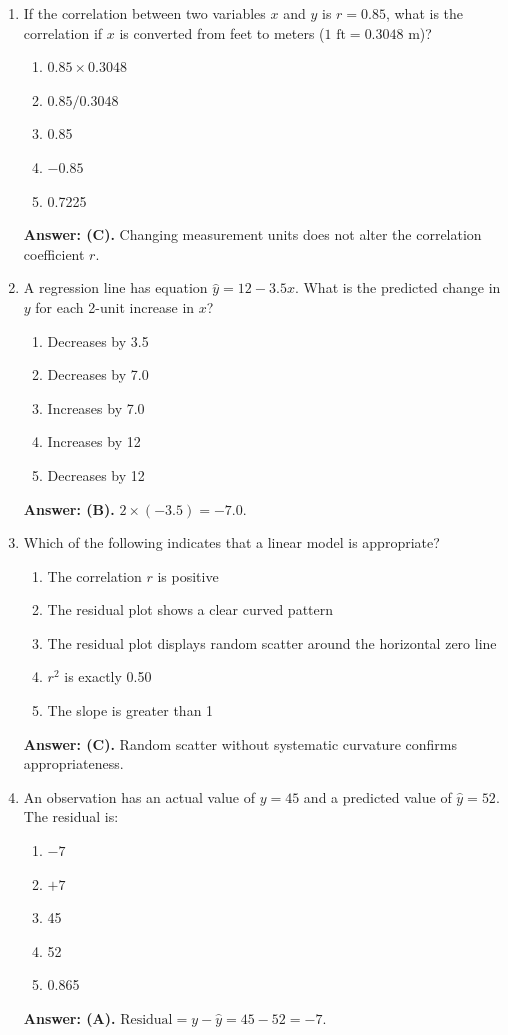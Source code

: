 \begin{enumerate}[leftmargin=1.5em]
  \item If the correlation between two variables $x$ and $y$ is $r = 0.85$, what is the correlation if $x$ is converted from feet to meters ($1\text{ ft} = 0.3048\text{ m}$)?
  \begin{enumerate}[label=(\Alph*)]
    \item $0.85 \times 0.3048$ \item $0.85 / 0.3048$ \item 0.85 \item $-0.85$ \item 0.7225
  \end{enumerate}
  \textbf{Answer: (C).} Changing measurement units does not alter the correlation coefficient $r$.

  \item A regression line has equation $\hat{y} = 12 - 3.5x$. What is the predicted change in $y$ for each 2-unit increase in $x$?
  \begin{enumerate}[label=(\Alph*)]
    \item Decreases by 3.5 \item Decreases by 7.0 \item Increases by 7.0 \item Increases by 12 \item Decreases by 12
  \end{enumerate}
  \textbf{Answer: (B).} $2 \times (-3.5) = -7.0$.

  \item Which of the following indicates that a linear model is appropriate?
  \begin{enumerate}[label=(\Alph*)]
    \item The correlation $r$ is positive \item The residual plot shows a clear curved pattern \item The residual plot displays random scatter around the horizontal zero line \item $r^2$ is exactly 0.50 \item The slope is greater than 1
  \end{enumerate}
  \textbf{Answer: (C).} Random scatter without systematic curvature confirms appropriateness.

  \item An observation has an actual value of $y = 45$ and a predicted value of $\hat{y} = 52$. The residual is:
  \begin{enumerate}[label=(\Alph*)]
    \item $-7$ \item $+7$ \item 45 \item 52 \item 0.865
  \end{enumerate}
  \textbf{Answer: (A).} $\text{Residual} = y - \hat{y} = 45 - 52 = -7$.


\end{enumerate}
